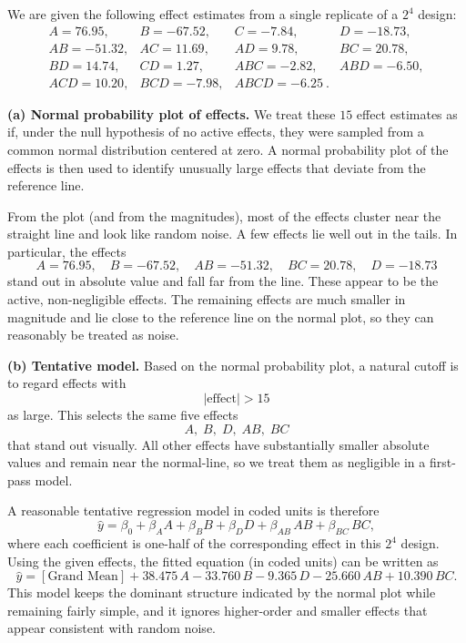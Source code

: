 \documentclass[answers,12pt,addpoints]{exam}
\begin{document}
\begin{solution}

We are given the following effect estimates from a single replicate of a $2^4$ design:
\[
\begin{array}{llll}
A = 76.95, & B = -67.52, & C = -7.84, & D = -18.73,\\
AB = -51.32, & AC = 11.69, & AD = 9.78, & BC = 20.78,\\
BD = 14.74, & CD = 1.27, & ABC = -2.82, & ABD = -6.50,\\
ACD = 10.20, & BCD = -7.98, & ABCD = -6.25~.
\end{array}
\]

\medskip
\textbf{(a) Normal probability plot of effects.}
We treat these $15$ effect estimates as if, under the null hypothesis of no active effects, they were sampled from a common normal distribution centered at zero. A normal probability plot of the effects is then used to identify unusually large effects that deviate from the reference line.

From the plot (and from the magnitudes), most of the effects cluster near the straight line and look like random noise. A few effects lie well out in the tails. In particular, the effects
\[
A = 76.95,\quad B = -67.52,\quad AB = -51.32,\quad BC = 20.78,\quad D = -18.73
\]
stand out in absolute value and fall far from the line. These appear to be the active, non-negligible effects. The remaining effects are much smaller in magnitude and lie close to the reference line on the normal plot, so they can reasonably be treated as noise.

\medskip
\textbf{(b) Tentative model.}
Based on the normal probability plot, a natural cutoff is to regard effects with
\[
|\text{effect}| > 15
\]
as large. This selects the same five effects
\[
A,\; B,\; D,\; AB,\; BC
\]
that stand out visually. All other effects have substantially smaller absolute values and remain near the normal-line, so we treat them as negligible in a first-pass model.

A reasonable tentative regression model in coded units is therefore
\[
\hat{y} = \beta_0 + \beta_A A + \beta_B B + \beta_D D + \beta_{AB}\,AB + \beta_{BC}\,BC,
\]
where each coefficient is one-half of the corresponding effect in this $2^4$ design. Using the given effects, the fitted equation (in coded units) can be written as
\[
\hat{y} = [\text{Grand Mean}]
+ 38.475\,A - 33.760\,B - 9.365\,D
- 25.660\,AB + 10.390\,BC.
\]
This model keeps the dominant structure indicated by the normal plot while remaining fairly simple, and it ignores higher-order and smaller effects that appear consistent with random noise.

\end{solution}
\end{document}
